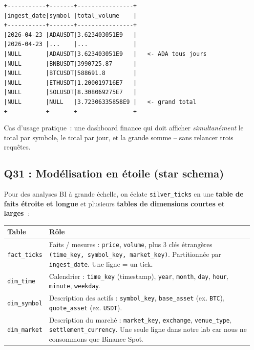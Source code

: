\documentclass{RapportINPTCLOUD}
\begin{document}
\begin{lstlisting}[style=code]
+-----------+-------+----------------+
|ingest_date|symbol |total_volume    |
+-----------+-------+----------------+
|2026-04-23 |ADAUSDT|3.623403051E9   |
|2026-04-23 |...    |...             |
|NULL       |ADAUSDT|3.623403051E9   |   <- ADA tous jours
|NULL       |BNBUSDT|3990725.87      |
|NULL       |BTCUSDT|588691.8        |
|NULL       |ETHUSDT|1.200019716E7   |
|NULL       |SOLUSDT|8.308069275E7   |
|NULL       |NULL   |3.72306335858E9 |   <- grand total
+-----------+-------+----------------+
\end{lstlisting}

Cas d'usage pratique~: une dashboard \og finance\fg{} qui doit afficher \textit{simultan\'{e}ment} le total par symbole, le total par jour, et la grande somme -- sans relancer trois requ\^{e}tes.

\subsection{Q31 : Mod\'{e}lisation en \'{e}toile (star schema)}

Pour des analyses BI \`{a} grande \'{e}chelle, on \'{e}clate \texttt{silver\_ticks} en une \textbf{table de faits \'{e}troite et longue} et plusieurs \textbf{tables de dimensions courtes et larges}~:

\begin{center}
\begin{tabular}{|l|p{8cm}|}
\hline
\textbf{Table} & \textbf{R\^{o}le} \\
\hline
\texttt{fact\_ticks} & Faits / mesures : \texttt{price}, \texttt{volume}, plus 3 cl\'{e}s \'{e}trang\`{e}res \texttt{(time\_key, symbol\_key, market\_key)}. Partitionn\'{e}e par \texttt{ingest\_date}. Une ligne = un tick. \\
\hline
\texttt{dim\_time} & Calendrier : \texttt{time\_key} (timestamp), \texttt{year}, \texttt{month}, \texttt{day}, \texttt{hour}, \texttt{minute}, \texttt{weekday}. \\
\hline
\texttt{dim\_symbol} & Description des actifs : \texttt{symbol\_key}, \texttt{base\_asset} (ex. \texttt{BTC}), \texttt{quote\_asset} (ex. \texttt{USDT}). \\
\hline
\texttt{dim\_market} & Description du march\'{e} : \texttt{market\_key}, \texttt{exchange}, \texttt{venue\_type}, \texttt{settlement\_currency}. Une seule ligne dans notre lab car nous ne consommons que Binance Spot. \\
\hline
\end{tabular}
\end{center}
\end{document}
